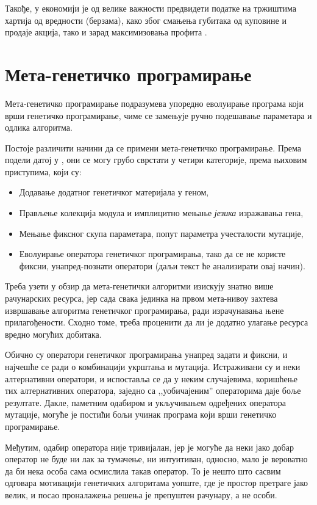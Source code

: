 \documentclass[a4paper]{article}
\begin{document}
Такође, у економији је од велике важности предвидети податке на тржиштима хартија од вредности (берзама), како због смањења губитака од куповине и продаје акција, тако и зарад максимизовања профита \cite{stock}.

\section{Мета-генетичко програмирање}

Мета-генетичко програмирање подразумева упоредно еволуирање програма који врши генетичко програмирање, чиме се замењује ручно подешавање параметара и одлика алгоритма.


Постоје различити начини да се примени мета-генетичко програмирање. Према подели датој у \cite{edmonds2001meta}, они се могу грубо сврстати у четири категорије, према њиховим приступима, који су:

\begin{itemize}
    \item Додавање додатног генетичког материјала у геном,
    \item Прављење колекција модула и имплицитно мењање \emph{језика} изражавања гена,
    \item Мењање фиксног скупа параметара, попут параметра учесталости мутације,
    \item Еволуирање оператора генетичког програмирања, тако да се не користе фиксни, унапред-познати оператори (даљи текст ће анализирати овај начин).
\end{itemize}

Треба узети у обзир да мета-генетички алгоритми изискују знатно више рачунарских ресурса, јер сада свака јединка на првом мета-нивоу захтева извршавање алгоритма генетичког програмирања, ради израчунавања њене прилагођености. Сходно томе, треба проценити да ли је додатно улагање ресурса вредно могућих добитака.

Обично су оператори генетичког програмирања унапред задати и фиксни, и најчешће се ради о комбинацији укрштања и мутација. Истраживани су и неки алтернативни оператори, и испоставља се да у неким случајевима, коришћење тих алтернативних оператора, заједно са ,,уобичајеним'' операторима даје боље резултате. Дакле, паметним одабиром и укључивањем одређених оператора мутације, могуће је постићи бољи учинак програма који врши генетичко програмирање.


Међутим, одабир оператора није тривијалан, јер је могуће да неки јако добар оператор не буде ни лак за тумачење, ни интуитиван, односно, мало је вероватно да би нека особа сама осмислила такав оператор. То је нешто што сасвим одговара мотивацији генетичких алгоритама уопште, где је простор претраге јако велик, и посао проналажења решења је препуштен рачунару, а не особи.
\end{document}
